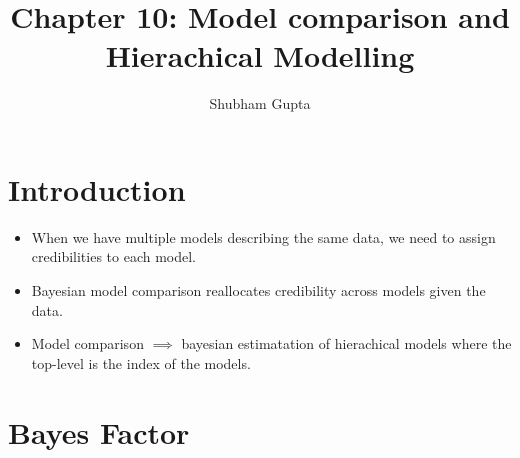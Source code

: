 \documentclass{article}
\title{Chapter 10: Model comparison and Hierachical Modelling}
\author{Shubham Gupta}
\begin{document}
\maketitle
\section{Introduction}
\begin{itemize}
    \item When we have multiple models describing the same data, we need to assign credibilities to each model.
    \item Bayesian model comparison reallocates credibility across models given the data.  
    \item Model comparison $\implies$ bayesian estimatation of hierachical models where the top-level is the index of the models.
\end{itemize}
\section{Bayes Factor}
\end{document}
